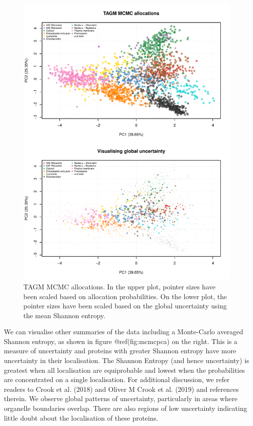 \documentclass[
]{article}
\begin{document}
\begin{figure}
\includegraphics[width=1\linewidth]{F1000TAGMworkflow_rev1_files/figure-latex/mcmcpca-1} \caption{TAGM MCMC allocations. In the upper plot, pointer sizes have been scaled based on allocation probabilities. On the lower plot, the pointer sizes have been scaled based on the global uncertainty using the mean Shannon entropy.}\label{fig:mcmcpca}
\end{figure}

We can visualise other summaries of the data including a Monte-Carlo
averaged Shannon entropy, as shown in figure @ref(fig:mcmcpca) on the
right. This is a measure of uncertainty and proteins with greater
Shannon entropy have more uncertainty in their localisation. The Shannon
Entropy (and hence uncertainty) is greatest when all localisation are
equiprobable and lowest when the probabilities are concentrated on a
single localisation. For additional discussion, we refer readers to
Crook et al. (2018) and Oliver M Crook et al. (2019) and references
therein. We observe global patterns of uncertainty, particularly in
areas where organelle boundaries overlap. There are also regions of low
uncertainty indicating little doubt about the localisation of these
proteins.
\end{document}
